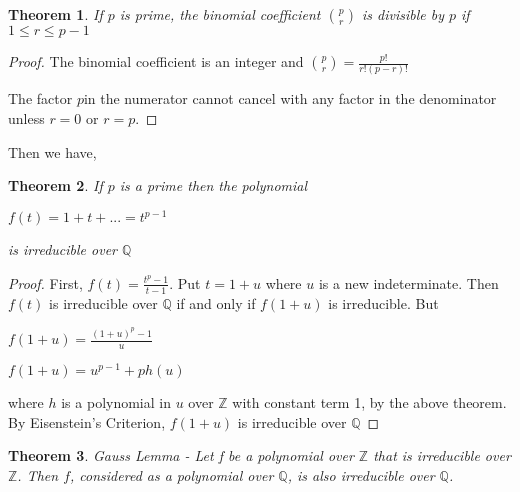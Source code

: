 \documentclass[12pt]{article}
\newtheorem{theorem}{Theorem}
\theoremstyle{definition}
\newcommand{\Z}{\mathbb Z}
\newcommand{\Q}{\mathbb Q}
\begin{document}
\begin{theorem}
If $p$ is prime, the binomial coefficient $\binom{p}{r}$ is divisible by $p$ if $1 \le r \le p-1$
\end{theorem}

\begin{proof}
The binomial coefficient is an integer and $\binom{p}{r} = \frac{p!}{r!(p-r)!}$

The factor $p$in the numerator cannot cancel with any factor in the denominator unless $r=0$ or $r=p$.
\end{proof}

Then we have,

\begin{theorem}
    If $p$ is a prime then the polynomial

    $f(t) = 1 + t + ... = t^{p-1}$

    is irreducible over $\Q$
\end{theorem}

\begin{proof}
First, $f(t) = \frac{t^p - 1}{t - 1}$. Put $t = 1 + u$ where $u$ is a new indeterminate. Then $f(t)$ is irreducible over $\Q$ if and only if $f(1+u)$ is irreducible. But

$f(1+u) = \frac{(1+u)^p - 1}{u}$

$f(1+u) = u^{p-1} + ph(u)$

where $h$ is a polynomial in $u$ over $\Z$ with constant term 1, by the above theorem. By Eisenstein's Criterion, $f(1+u)$ is irreducible over $\Q$

\end{proof}

\begin{theorem}
    Gauss Lemma - Let f be a polynomial over $\Z$ that is irreducible over $\Z$. Then $f$, considered as a polynomial over $\Q$, is also irreducible over $\Q$.
\end{theorem}
\end{document}
